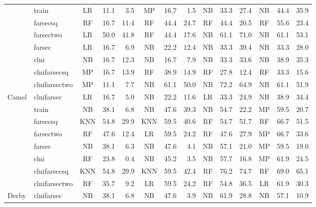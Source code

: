 \begin{table*}[!htbp]
\begin{tabular}{l|l|c|r|r|c|r|r|c|r|r|c|r|r}
 & train & LR & 11.1 & 3.5 & MP & 16.7 & 1.5 & NB & 33.3 & 27.4 & \cellcolor[HTML]{EFEFEF}NB & \cellcolor[HTML]{EFEFEF}44.4 & 35.9 \\  
 & farsecsq & RF & 16.7 & 11.4 & RF & 44.4 & 24.7 & RF & 44.4 & 20.5 & \cellcolor[HTML]{EFEFEF}RF & \cellcolor[HTML]{EFEFEF}55.6 & 23.4 \\  
 & farsectwo & LR & 50.0 & 41.8 & RF & 44.4 & 17.6 & \cellcolor[HTML]{EFEFEF}NB & \cellcolor[HTML]{EFEFEF}61.1 & 71.0 & \cellcolor[HTML]{EFEFEF}NB & \cellcolor[HTML]{EFEFEF}61.1 & 53.1 \\  
 & farsec & LR & 16.7 & 6.9 & NB & 22.2 & 12.4 & \cellcolor[HTML]{EFEFEF}NB & \cellcolor[HTML]{EFEFEF}33.3 & 39.4 & \cellcolor[HTML]{EFEFEF}NB & \cellcolor[HTML]{EFEFEF}33.3 & 28.0 \\  
 & clni & NB & 16.7 & 12.3 & NB & 16.7 & 7.9 & NB & 33.3 & 33.6 & \cellcolor[HTML]{EFEFEF}NB & \cellcolor[HTML]{EFEFEF}38.9 & 35.3 \\  
 & clnifarsecsq & MP & 16.7 & 13.9 & \cellcolor[HTML]{EFEFEF}RF & \cellcolor[HTML]{EFEFEF}38.9 & 14.9 & RF & 27.8 & 12.4 & RF & 33.3 & 15.6 \\  
 & clnifarsectwo & MP & 11.1 & 7.7 & NB & 61.1 & 50.0 & \cellcolor[HTML]{EFEFEF}NB & \cellcolor[HTML]{EFEFEF}72.2 & 64.9 & NB & 61.1 & 51.9 \\  
\multirow{-8}{*}{Camel} & clnifarsec & LR & 16.7 & 5.0 & NB & 22.2 & 11.6 & LR & 33.3 & 24.9 & \cellcolor[HTML]{EFEFEF}NB & \cellcolor[HTML]{EFEFEF}38.9 & 34.4 \\ \hline
 & train & NB & 38.1 & 6.8 & NB & 47.6 & 39.3 & NB & 54.7 & 22.2 & \cellcolor[HTML]{EFEFEF}MP & \cellcolor[HTML]{EFEFEF}59.5 & 20.7 \\  
 & farsecsq & KNN & 54.8 & 29.9 & KNN & 59.5 & 40.6 & RF & 54.7 & 51.7 & \cellcolor[HTML]{EFEFEF}RF & \cellcolor[HTML]{EFEFEF}66.7 & 51.5 \\  
 & farsectwo & RF & 47.6 & 12.4 & LR & 59.5 & 24.2 & RF & 47.6 & 27.9 & \cellcolor[HTML]{EFEFEF}MP & \cellcolor[HTML]{EFEFEF}66.7 & 33.6 \\  
 & farsec & NB & 38.1 & 6.3 & NB & 47.6 & 4.1 & NB & 57.1 & 21.0 & \cellcolor[HTML]{EFEFEF}MP & \cellcolor[HTML]{EFEFEF}59.5 & 19.0 \\  
 & clni & RF & 23.8 & 0.4 & NB & 45.2 & 3.5 & NB & 57.7 & 16.8 & \cellcolor[HTML]{EFEFEF}MP & \cellcolor[HTML]{EFEFEF}61.9 & 24.5 \\  
 & clnifarsecsq & KNN & 54.8 & 29.9 & KNN & 59.5 & 42.4 & \cellcolor[HTML]{EFEFEF}RF & \cellcolor[HTML]{EFEFEF}76.2 & 74.7 & RF & 69.0 & 65.1 \\  
 & clnifarsectwo & RF & 35.7 & 9.2 & LR & 59.5 & 24.2 & RF & 54.8 & 36.5 & \cellcolor[HTML]{EFEFEF}LR & \cellcolor[HTML]{EFEFEF}61.9 & 30.3 \\  
\multirow{-8}{*}{Derby} & clnifarsec & NB & 38.1 & 6.8 & NB & 47.6 & 3.9 & \cellcolor[HTML]{EFEFEF}NB & \cellcolor[HTML]{EFEFEF}61.9 & 28.8 & NB & 57.1 & 10.9 \\ \hline
\end{tabular}
\label{tbl:tuningRecall}
\end{table*}

